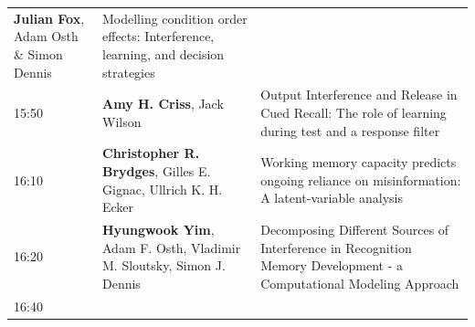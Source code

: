 \documentclass[]{article}
\begin{document}
\begin{longtable}[]{@{}lll@{}}
\begin{minipage}[t]{0.32\columnwidth}
\textbf{Julian Fox}, Adam Osth \& Simon Dennis\strut
\end{minipage} & \begin{minipage}[t]{0.57\columnwidth}\raggedright\strut
Modelling condition order effects: Interference, learning, and decision
strategies\strut
\end{minipage}\tabularnewline
\begin{minipage}[t]{0.03\columnwidth}\raggedright\strut
15:50\strut
\end{minipage} & \begin{minipage}[t]{0.32\columnwidth}\raggedright\strut
\textbf{Amy H. Criss}, Jack Wilson\strut
\end{minipage} & \begin{minipage}[t]{0.57\columnwidth}\raggedright\strut
Output Interference and Release in Cued Recall: The role of learning
during test and a response filter\strut
\end{minipage}\tabularnewline
\begin{minipage}[t]{0.03\columnwidth}\raggedright\strut
16:10\strut
\end{minipage} & \begin{minipage}[t]{0.32\columnwidth}\raggedright\strut
\textbf{Christopher R. Brydges}, Gilles E. Gignac, Ullrich K. H.
Ecker\strut
\end{minipage} & \begin{minipage}[t]{0.57\columnwidth}\raggedright\strut
Working memory capacity predicts ongoing reliance on misinformation: A
latent-variable analysis\strut
\end{minipage}\tabularnewline
\begin{minipage}[t]{0.03\columnwidth}\raggedright\strut
16:20\strut
\end{minipage} & \begin{minipage}[t]{0.32\columnwidth}\raggedright\strut
\textbf{Hyungwook Yim}, Adam F. Osth, Vladimir M. Sloutsky, Simon J.
Dennis\strut
\end{minipage} & \begin{minipage}[t]{0.57\columnwidth}\raggedright\strut
Decomposing Different Sources of Interference in Recognition Memory
Development - a Computational Modeling Approach\strut
\end{minipage}\tabularnewline
\begin{minipage}[t]{0.03\columnwidth}\raggedright\strut
16:40\strut
\end{minipage} & \begin{minipage}[t]{0.32\columnwidth}\raggedright\strut

\end{minipage}
\end{longtable}
\end{document}
